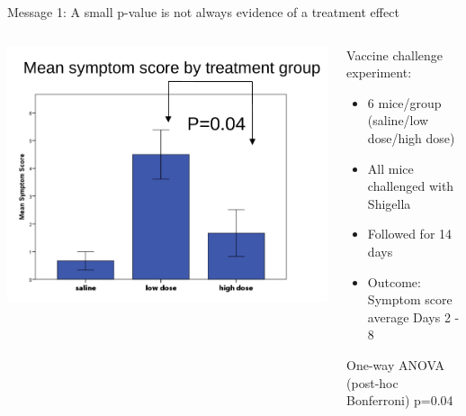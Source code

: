 \documentclass{beamer}
\begin{document}
\begin{frame}{Message 1: A small p-value is not always evidence of a treatment effect}

  \begin{columns}
    \begin{column}{0.5\textwidth}
	\begin{center}
	\includegraphics[width=\textwidth]{Figures/message1}
	\end{center}
    \end{column}
    
    \begin{column}{0.5\textwidth}
    \begin{block}{Vaccine challenge experiment:}
      \begin{itemize} 
       \item 6 mice/group (saline/low dose/high dose)
       \item All mice challenged with Shigella
       \item Followed for 14 days
       \item  Outcome: Symptom score average Days 2 - 8
      \end{itemize}
      \end{block}
      
      \begin{alertblock}{}
       One-way ANOVA (post-hoc Bonferroni) p=0.04
      \end{alertblock}

    \end{column}
  \end{columns}
  

\end{frame}
\end{document}
